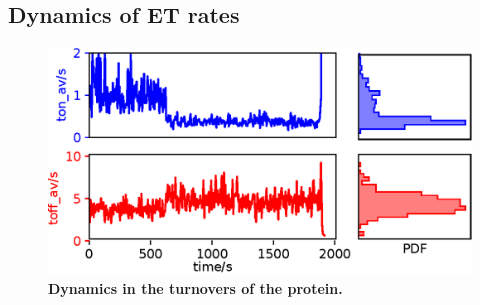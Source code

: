 \documentclass[journal=jacsat,manuscript=article]{achemso}
\begin{document}
\subsection{Dynamics of ET rates}
\begin{figure}
	\includegraphics[width=\textwidth]{Figure/dynamic_rates.eps}
	\caption{\textbf{Dynamics in the turnovers of the protein.}}
	\label{fig:dynamic_rates}
\end{figure}
\end{document}
